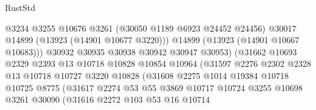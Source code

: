 \begin{lexlean}{RustStd}
\begin{coremodule}
                                      @3234
                                      @3255
                                      @10676
                                      @3261
                                      (@30050 @1189 @6923 @24452 @24456)
                                      @30017
                                      @14899
                                      (@13923 (@14901 @10677 @3220)))
                                    @14899
                                    (@13923 (@14901 @10667 @10683)))
                                  @30932
                                  @30935
                                  @30938
                                  @30942
                                  @30947
                                  @30953)
                                (@31662
                                  @10693
                                  @2329
                                  @2393
                                  @13
                                  @10718
                                  @10828
                                  @10854
                                  @10964
                                  (@31597
                                    @2276
                                    @2302
                                    @2328
                                    @13
                                    @10718
                                    @10727
                                    @3220
                                    @10828
                                    (@31608
                                      @2275
                                      @1014
                                      @19384
                                      @10718
                                      @10725
                                      @8775
                                      (@31617
                                        @2274
                                        @53
                                        @55
                                        @3869
                                        @10717
                                        @10724
                                        @3255
                                        @10698
                                        @3261
                                        @30090
                                        (@31616
                                          @2272
                                          @103
                                          @53
                                          @16
                                          @10714

\end{coremodule}
\end{lexlean}
